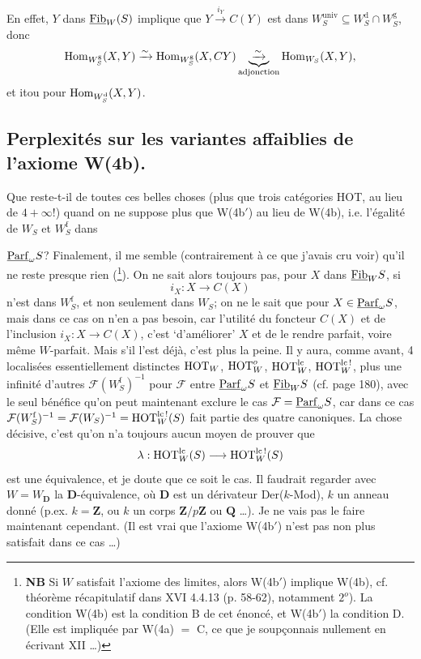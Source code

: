 En effet, $Y$ dans $\underline{\mathrm{Fib}}_W(S)$ implique que $Y \xrightarrow{i_Y} C(Y)$ est dans $W^{\mathrm{univ}}_S \subseteq W^{\mathrm{d}}_S \cap W^{\mathrm{g}}_S$, donc
\[
\mathrm{Hom}_{W^{\mathrm{g}}_S}(X, Y) \xrightarrow{\sim} \mathrm{Hom}_{W^{\mathrm{g}}_S}(X, CY) \underbrace{\xrightarrow{\sim}}_{\text{adjonction}} \mathrm{Hom}_{W_S}(X, Y),
\]
et itou pour $\mathrm{Hom}_{W^{\mathrm{d}}_S}(X, Y)$.

\subsection*{ Perplexités sur les variantes affaiblies de l’axiome \textmd{W(4b)}.}

Que reste-t-il de toutes ces belles choses (plus que trois catégories HOT, au lieu de $4+\infty$!) quand on ne suppose plus que W(4b$'$) au lieu de W(4b), i.e. l’égalité de $W_S$ et $W^{\mathrm{f}}_S$ dans


$\underline{\mathrm{Parf}}_\omega S$? Finalement, il me semble (contrairement à ce que j'avais cru voir) qu'il ne reste presque rien (\footnote{\textbf{NB} Si $W$ satisfait l'axiome des limites, alors W(4b$'$) implique W(4b), cf. théorème récapitulatif dans XVI 4.4.13 (p. 58-62), notamment $2^{o}$). La condition W(4b) est la condition B de cet énoncé, et W(4b$'$) la condition D. (Elle est impliquée par W(4a) $=$ C, ce que je soupçonnais nullement en écrivant XII \dots)}). On ne sait alors toujours pas, pour $X$ dans $\underline{\mathrm{Fib}}_W S$, si
\[ i_X : X \longrightarrow C(X) \]
n'est dans $W^{\mathrm{f}}_S$, et non seulement dans $W_S$; on ne le sait que pour $X \in \underline{\mathrm{Parf}}_\omega S$, mais dans ce cas on n'en a pas besoin, car l'utilité du foncteur $C(X)$ et de l'inclusion $i_X : X \longrightarrow C(X)$, c'est ‘d'améliorer’ $X$ et de le rendre parfait, voire même $W$-parfait. Mais s'il l'est déjà, c'est plus la peine. Il y aura, comme
avant, 4 localisées essentiellement distinctes $\mathrm{HOT}_W$, $\mathrm{HOT}^{o}_W$, $\mathrm{HOT}^{\mathrm{lc}}_W$, $\mathrm{HOT}^{\mathrm{lc}\,!}_W$, plus une infinité d'autres $\mathcal{F}(W^{\mathrm{f}}_S)^{-1}$ pour $\mathcal{F}$ entre $\underline{\mathrm{Parf}}_\omega S$ et $\underline{\mathrm{Fib}}_W S$ (cf. page 180), avec le seul bénéfice qu'on peut maintenant exclure le cas $\mathcal{F} = \underline{\mathrm{Parf}}_\omega S$, car dans ce cas $\mathcal{F}(W^{\mathrm{f}}_S)^{-1} = \mathcal{F}(W_S)^{-1} = \mathrm{HOT}^{\mathrm{lc}\,!}_W(S)$ fait partie des quatre canoniques. La chose décisive, c'est qu'on n'a toujours aucun moyen de prouver que
\[ \lambda : \mathrm{HOT}^{\mathrm{lc}}_W(S) \longrightarrow \mathrm{HOT}^{\mathrm{lc}\,!}_W(S) \]
est une équivalence, et je doute que ce soit le cas. Il faudrait regarder avec $W = W_{\mathbf{D}}$ la $\mathbf{D}$-équivalence, où $\mathbf{D}$ est un dérivateur Der($k$-Mod), $k$ un anneau donné (p.ex. $k = \mathbf{Z}$, ou $k$ un corps $\mathbf{Z}/p\mathbf{Z}$ ou $\mathbf{Q}$ \dots). Je ne vais pas le faire maintenant cependant. (Il est vrai que l'axiome W(4b$'$) n'est pas non plus satisfait dans ce cas \dots)

